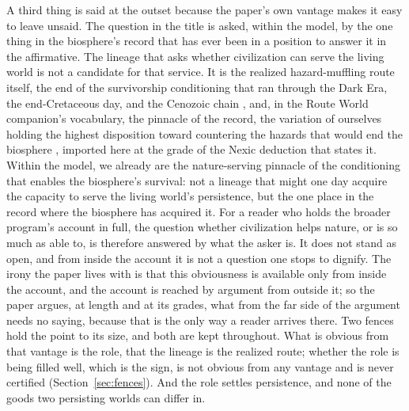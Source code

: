 
A third thing is said at the outset because the paper's own vantage makes
it easy to leave unsaid. The question in the title is asked, within the
model, by the one thing in the biosphere's record that has ever been in a
position to answer it in the affirmative. The lineage that asks whether
civilization can serve the living world is not a candidate for that
service. It is the realized hazard-muffling route itself, the end of the
survivorship conditioning that ran through the Dark Era, the
end-Cretaceous day, and the Cenozoic chain \cite{Nexus}, and, in the Route
World companion's vocabulary, the pinnacle of the record, the variation of
ourselves holding the highest disposition toward countering the hazards
that would end the biosphere \cite{GoldenRouteWorld}, imported here at the
grade of the Nexic deduction that states it. Within the model, we already
are the nature-serving pinnacle of the conditioning that enables the
biosphere's survival: not a lineage that might one day acquire the
capacity to serve the living world's persistence, but the one place in the
record where the biosphere has acquired it. For a reader who holds the
broader program's account in full, the question whether civilization helps
nature, or is so much as able to, is therefore answered by what the asker
is. It does not stand as open, and from inside the account it is not a
question one stops to dignify. The irony the paper lives with is that this
obviousness is available only from inside the account, and the account is
reached by argument from outside it; so the paper argues, at length and at
its grades, what from the far side of the argument needs no saying, because
that is the only way a reader arrives there. Two fences hold the point to
its size, and both are kept throughout. What is obvious from that vantage
is the role, that the lineage is the realized route; whether the role is
being filled well, which is the sign, is not obvious from any vantage and
is never certified (Section~\ref{sec:fences}). And the role settles
persistence, and none of the goods two persisting worlds can differ in.


